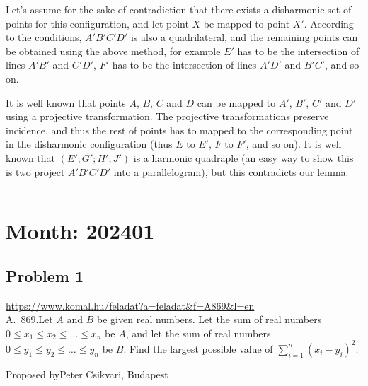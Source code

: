 \documentclass{article}
\begin{document}
Let's assume for the sake of contradiction that there exists a disharmonic set of points for this configuration, and let point \(\displaystyle X\) be mapped to point \(\displaystyle X'\). According to the conditions, \(\displaystyle A'B'C'D'\) is also a quadrilateral, and the remaining points can be obtained using the above method, for example \(\displaystyle E'\) has to be the intersection of lines \(\displaystyle A'B'\) and \(\displaystyle C'D'\), \(\displaystyle F'\) has to be the intersection of lines \(\displaystyle A'D'\) and \(\displaystyle B'C'\), and so on.

It is well known that points \(\displaystyle A\), \(\displaystyle B\), \(\displaystyle C\) and \(\displaystyle D\) can be mapped to \(\displaystyle A'\), \(\displaystyle B'\), \(\displaystyle C'\) and \(\displaystyle D'\) using a projective transformation. The projective transformations preserve incidence, and thus the rest of points has to mapped to the corresponding point in the disharmonic configuration (thus \(\displaystyle E\) to \(\displaystyle E'\), \(\displaystyle F\) to \(\displaystyle F'\), and so on). It is well known that \(\displaystyle (E';G';H';J')\) is a harmonic quadraple (an easy way to show this is two project \(\displaystyle A'B'C'D'\) into a parallelogram), but this contradicts our lemma.

\vspace{1em}
\hrule
\vspace{1em}

\section*{Month: 202401}

\subsection*{Problem 1}
\noindent\url{https://www.komal.hu/feladat?a=feladat&f=A869&l=en}\\[1em]

A. 869.Let \(\displaystyle A\) and \(\displaystyle B\) be given real numbers. Let the sum of real numbers \(\displaystyle 0\le x_1\le x_2\le\dots\le x_n\) be \(\displaystyle A\), and let the sum of real numbers \(\displaystyle 0\le y_1\le y_2\le\dots\le y_n\) be \(\displaystyle B\). Find the largest possible value of \(\displaystyle {\sum_{i=1}^n (x_i-y_i)^2}\).

Proposed byPeter Csikvari, Budapest
\end{document}

